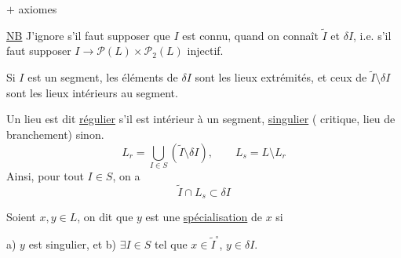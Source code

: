  $+$ axiomes

\uline{NB} J'ignore s'il faut supposer que $I$ est connu, quand on connaît $\tilde I$ et $\delta I$, i.e. s'il faut supposer $I\longrightarrow\mathcal P(L)\times\mathcal P_2(L)$ injectif.


Si $I$ est un segment, les éléments de $\delta I$ sont les lieux extrémités, et ceux de $\tilde I\setminus\delta I$  sont les lieux intérieurs au segment.

Un lieu est dit \uline{régulier} s'il est intérieur à  un segment, \uline{singulier} ( critique, lieu de branchement) sinon.
\[
L_r=\bigcup_{I\in S}(\tilde I\setminus\delta I),\qquad L_s=L\setminus L_r
\]
Ainsi, pour tout $I\in S$, on a
\[
\tilde I\cap L_s\subset\delta I
\]


Soient $x,y\in L$, on dit que $y$ est une \uline{spécialisation} de $x$ si \deleted{$\unsure{\exists}$}

a) $y$ est singulier, et b) $\exists I\in S$ tel que $x\in\tilde I^\circ$, $y\in\delta I$.


